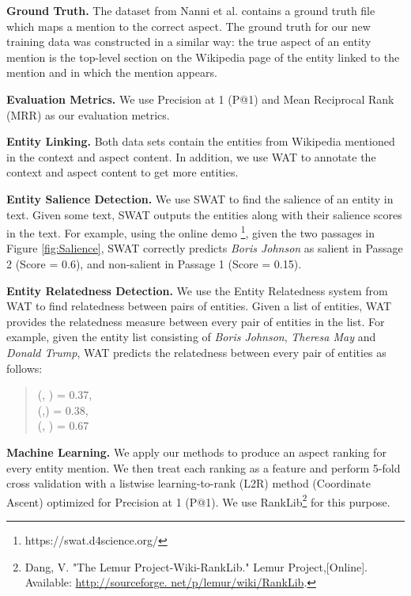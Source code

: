 \textbf{Ground Truth.} The dataset from Nanni et al. \cite{nanni2018entity} contains a ground truth file which maps a mention to the correct aspect. %
The ground truth for our new training data was constructed in a similar way: the true aspect of an entity mention is the top-level section on the Wikipedia page of the entity linked to the mention and in which the mention appears.

\textbf{Evaluation Metrics.} We use Precision at 1 (P@1) and Mean Reciprocal Rank (MRR) as our evaluation metrics.

\textbf{Entity Linking.} Both data sets contain the entities from Wikipedia mentioned in the context and aspect content. In addition, we use WAT \cite{piccinno2014wat} to annotate the context and aspect content to get more entities. 

\textbf{Entity Salience Detection.} We use SWAT \cite{swat}  to find the salience of an entity in text. Given some text, SWAT outputs the entities along with their salience scores in the text. For example, using the online demo \footnote{https://swat.d4science.org/}, given the two passages in Figure \ref{fig:Salience}, SWAT correctly predicts \textit{Boris Johnson} as salient in Passage 2 (Score = 0.6), and non-salient in Passage 1 (Score = 0.15). 

\textbf{Entity Relatedness Detection.} We use the Entity Relatedness system from WAT \cite{piccinno2014wat} to find relatedness between pairs of entities. Given a list of entities, WAT provides the relatedness measure between every pair of entities in the list. For example, given the entity list consisting of \textit{Boris Johnson}, \textit{Theresa May} and \textit{Donald Trump}, WAT predicts the relatedness between every pair of entities as follows:
\begin{quote}
    (, ) = 0.37, \\
    (,)    = 0.38, \\
    (, )  = 0.67
\end{quote}

\textbf{Machine Learning.}
We apply our methods to produce an aspect ranking for every entity mention. We then treat each ranking as a feature and perform 5-fold cross validation with a listwise learning-to-rank (L2R) method (Coordinate Ascent) optimized for Precision at 1 (P@1). We use RankLib\footnote{Dang, V. "The Lemur Project-Wiki-RankLib." Lemur Project,[Online]. Available: \url{http://sourceforge. net/p/lemur/wiki/RankLib}.} for this purpose. 

